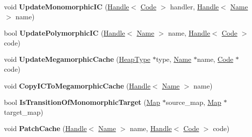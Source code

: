 \begin{DoxyCompactItemize}
\item 
\hypertarget{classv8_1_1internal_1_1_i_c_a9487c32a2748a45c4b35995ecbeb79c6}{}void {\bfseries Update\+Monomorphic\+I\+C} (\hyperlink{classv8_1_1internal_1_1_handle}{Handle}$<$ \hyperlink{classv8_1_1internal_1_1_code}{Code} $>$ handler, \hyperlink{classv8_1_1internal_1_1_handle}{Handle}$<$ \hyperlink{classv8_1_1internal_1_1_name}{Name} $>$ name)\label{classv8_1_1internal_1_1_i_c_a9487c32a2748a45c4b35995ecbeb79c6}

\item 
\hypertarget{classv8_1_1internal_1_1_i_c_adafd09efd250b79ba9358b7baa61dec1}{}bool {\bfseries Update\+Polymorphic\+I\+C} (\hyperlink{classv8_1_1internal_1_1_handle}{Handle}$<$ \hyperlink{classv8_1_1internal_1_1_name}{Name} $>$ name, \hyperlink{classv8_1_1internal_1_1_handle}{Handle}$<$ \hyperlink{classv8_1_1internal_1_1_code}{Code} $>$ code)\label{classv8_1_1internal_1_1_i_c_adafd09efd250b79ba9358b7baa61dec1}

\item 
\hypertarget{classv8_1_1internal_1_1_i_c_aea236ed0d63e844de5283ae3a04bb9ae}{}void {\bfseries Update\+Megamorphic\+Cache} (\hyperlink{classv8_1_1internal_1_1_type_impl}{Heap\+Type} $\ast$type, \hyperlink{classv8_1_1internal_1_1_name}{Name} $\ast$name, \hyperlink{classv8_1_1internal_1_1_code}{Code} $\ast$code)\label{classv8_1_1internal_1_1_i_c_aea236ed0d63e844de5283ae3a04bb9ae}

\item 
\hypertarget{classv8_1_1internal_1_1_i_c_aa7a45201b57aadcc703589595732dd27}{}void {\bfseries Copy\+I\+C\+To\+Megamorphic\+Cache} (\hyperlink{classv8_1_1internal_1_1_handle}{Handle}$<$ \hyperlink{classv8_1_1internal_1_1_name}{Name} $>$ name)\label{classv8_1_1internal_1_1_i_c_aa7a45201b57aadcc703589595732dd27}

\item 
\hypertarget{classv8_1_1internal_1_1_i_c_a83a598f66df33606287db27e536e652f}{}bool {\bfseries Is\+Transition\+Of\+Monomorphic\+Target} (\hyperlink{classv8_1_1internal_1_1_map}{Map} $\ast$source\+\_\+map, \hyperlink{classv8_1_1internal_1_1_map}{Map} $\ast$target\+\_\+map)\label{classv8_1_1internal_1_1_i_c_a83a598f66df33606287db27e536e652f}

\item 
\hypertarget{classv8_1_1internal_1_1_i_c_a9f433a14510c324fd859c5bff5e64527}{}void {\bfseries Patch\+Cache} (\hyperlink{classv8_1_1internal_1_1_handle}{Handle}$<$ \hyperlink{classv8_1_1internal_1_1_name}{Name} $>$ name, \hyperlink{classv8_1_1internal_1_1_handle}{Handle}$<$ \hyperlink{classv8_1_1internal_1_1_code}{Code} $>$ code)\label{classv8_1_1internal_1_1_i_c_a9f433a14510c324fd859c5bff5e64527}


\end{DoxyCompactItemize}

